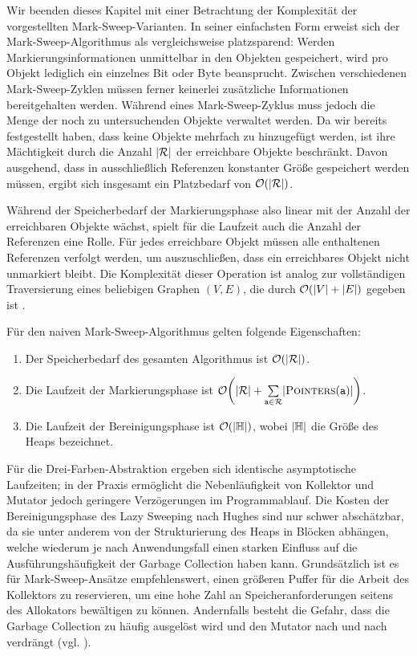 Wir beenden dieses Kapitel mit einer Betrachtung der Komplexität der vorgestellten Mark-Sweep-Varianten.
In seiner einfachsten Form erweist sich der Mark-Sweep-Algorithmus als vergleichsweise platzsparend:
Werden Markierungsinformationen unmittelbar in den Objekten gespeichert, wird pro Objekt lediglich ein einzelnes Bit oder Byte beansprucht.
Zwischen verschiedenen Mark-Sweep-Zyklen müssen ferner keinerlei zusätzliche Informationen bereitgehalten werden.
Während eines Mark-Sweep-Zyklus muss jedoch die Menge  der noch zu untersuchenden Objekte verwaltet werden.
Da wir bereits festgestellt haben, dass keine Objekte mehrfach zu  hinzugefügt werden, ist ihre Mächtigkeit durch die Anzahl $|\mathcal{R}|$ der erreichbare Objekte beschränkt.
Davon ausgehend, dass in  ausschließlich Referenzen konstanter Größe gespeichert werden müssen, ergibt sich insgesamt ein Platzbedarf von $\mathcal{O}(|\mathcal{R}|)$.

Während der Speicherbedarf der Markierungsphase also linear mit der Anzahl der erreichbaren Objekte wächst, spielt für die Laufzeit auch die Anzahl der Referenzen eine Rolle.
Für jedes erreichbare Objekt müssen alle enthaltenen Referenzen verfolgt werden, um auszuschließen, dass ein erreichbares Objekt nicht unmarkiert bleibt.
Die Komplexität dieser Operation ist analog zur vollständigen Traversierung eines beliebigen Graphen $(V,E)$, die durch $\mathcal{O}(|V|+|E|)$ gegeben ist \cite[Kap. 22]{cormen-leiserson}.

\begin{mybox}
\begin{satz}
	\label{satz:mark-sweep-complexity}
	Für den naiven Mark-Sweep-Algorithmus gelten folgende Eigenschaften:
	\begin{enumerate}[(1)]
		\item Der Speicherbedarf des gesamten Algorithmus ist $\mathcal{O}(|\mathcal{R}|)$.
		\item Die Laufzeit der Markierungsphase ist $\oh\enb{|\Reach|+\sum\limits_{\Var{a} \in \Reach}^{} \abs{\Pointers(\Var{a})}}$.
		\item Die Laufzeit der Bereinigungsphase ist $\mathcal{O}(|\mathbb{H}|)$, wobei $|\mathbb{H}|$ die Größe des Heaps bezeichnet.
	\end{enumerate}
\end{satz}
\end{mybox}

Für die Drei-Farben-Abstraktion ergeben sich identische asymptotische Laufzeiten; in der Praxis ermöglicht die Nebenläufigkeit von Kollektor und Mutator jedoch geringere Verzögerungen im Programmablauf.
Die Kosten der Bereinigungsphase des Lazy Sweeping nach Hughes sind nur schwer abschätzbar, da sie unter anderem von der Strukturierung des Heaps in Blöcken abhängen, welche wiederum je nach Anwendungsfall einen starken Einfluss auf die Ausführungshäufigkeit der Garbage Collection haben kann.
Grundsätzlich ist es für Mark-Sweep-Ansätze empfehlenswert, einen größeren Puffer für die Arbeit des Kollektors zu reservieren, um eine hohe Zahl an Speicheranforderungen seitens des Allokators bewältigen zu können.
Andernfalls besteht die Gefahr, dass die Garbage Collection zu häufig ausgelöst wird und den Mutator nach und nach verdrängt (vgl. \cite[S. 70]{jones-lins}).